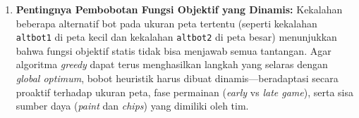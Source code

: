 \begin{enumerate}
    \item \textbf{Pentingnya Pembobotan Fungsi Objektif yang Dinamis:}
    Kekalahan beberapa alternatif bot pada ukuran peta tertentu (seperti kekalahan \texttt{altbot1} di peta kecil dan kekalahan \texttt{altbot2} di peta besar) menunjukkan bahwa fungsi objektif statis tidak bisa menjawab semua tantangan. Agar algoritma \textit{greedy} dapat terus menghasilkan langkah yang selaras dengan \textit{global optimum}, bobot heuristik harus dibuat dinamis—beradaptasi secara proaktif terhadap ukuran peta, fase permainan (\textit{early} vs \textit{late game}), serta sisa sumber daya (\textit{paint} dan \textit{chips}) yang dimiliki oleh tim.
\end{enumerate}